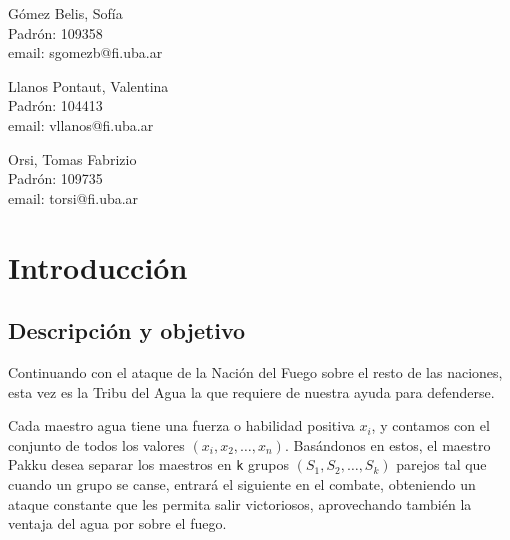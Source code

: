 \documentclass{article}
\begin{document}
\begin{titlepage}
\begin{center}
    {\begin{minipage}[t]{.32\textwidth}
        \begin{center}
          Gómez Belis, Sofía\\
          {\small{Padrón: 109358}}\\
          {\small{email: sgomezb@fi.uba.ar}}
        \end{center}
          \end{minipage}
          \begin{minipage}[t]{.32\textwidth}
        \begin{center}
          Llanos Pontaut, Valentina\\
          {\small{Padrón: 104413}}\\
          {\small{email: vllanos@fi.uba.ar}}\\
        \end{center}
      \end{minipage}
      \begin{minipage}[t]{.32\textwidth}
        \begin{center}
          Orsi, Tomas Fabrizio\\
          {\small{Padrón: 109735}}\\
          {\small{email: torsi@fi.uba.ar}}
        \end{center}
      \end{minipage}}

  \end{center}
\end{titlepage}

\renewcommand*\contentsname{Indice}
\tableofcontents
\pagebreak

\section{Introducción}
\subsection{Descripción y objetivo}

Continuando con el ataque de la Nación del Fuego sobre el resto de las naciones, esta vez es la Tribu del Agua la que requiere de nuestra ayuda para defenderse. 

Cada maestro agua tiene una fuerza o habilidad positiva $x_i$, y contamos con el conjunto de todos los valores $(x_i, x_2, \dots, x_n)$. Basándonos en estos, el maestro Pakku desea separar los maestros en \texttt{k} grupos $(S_1, S_2, \dots, S_k)$ parejos tal que cuando un grupo se canse, entrará el siguiente en el combate, obteniendo un ataque constante que les permita salir victoriosos, aprovechando también la ventaja del agua por sobre el fuego.
\end{document}
